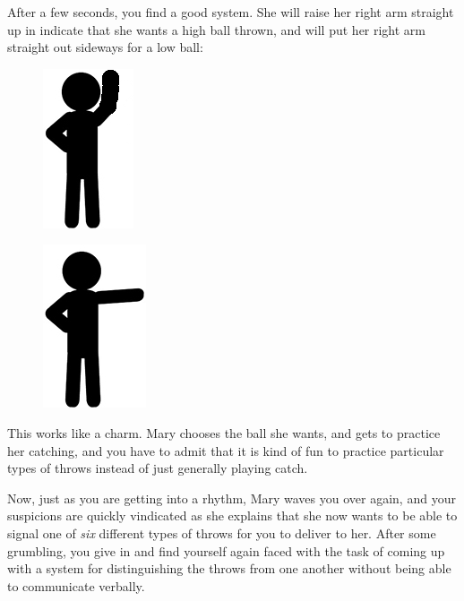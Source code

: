 \documentclass{book}
\begin{document}
After a few seconds, you find a good system. She will raise her right arm straight up in indicate that she wants a high ball thrown, and will put her right arm straight out sideways for a low ball:

\begin{figure}[H]
\centering
\captionsetup{labelformat=empty}
\begin{minipage}{.4\textwidth}
  \centering
  \includegraphics[width=.3\linewidth]{stick-figure-arm-raised}
  \label{fig:test1}
\end{minipage}%
\begin{minipage}{.4\textwidth}
  \centering
  \includegraphics[width=.3\linewidth]{stick-figure-arm-sideways}
  \label{fig:test2}
\end{minipage}
\end{figure}

This works like a charm. Mary chooses the ball she wants, and gets to practice her catching, and you have to admit that it is kind of fun to practice particular types of throws instead of just generally playing catch.

Now, just as you are getting into a rhythm, Mary waves you over again, and your suspicions are quickly vindicated as she explains that she now wants to be able to signal one of \emph{six} different types of throws for you to deliver to her. After some grumbling, you give in and find yourself again faced with the task of coming up with a system for distinguishing the throws from one another without being able to communicate verbally.
\end{document}
